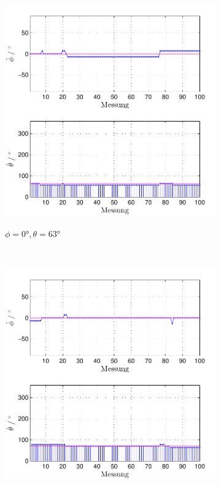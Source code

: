 \begin{figure}
        \begin{subfigure}[b]{0.48\textwidth}
                \centering
                \includegraphics[width=\textwidth]{images/04_Echtzeitversuch/MALE_Phi_0_Theta_63}
                \label{fig:Foto_DSP_Draufsicht}
                \caption{$\phi=0°, \theta = 63°$}
        \end{subfigure}
        ~ %
        \begin{subfigure}[b]{0.48\textwidth}
                \centering
                \includegraphics[width=\textwidth]{images/04_Echtzeitversuch/MALE_Phi_0_Theta_71}

\end{subfigure}
\end{figure}
